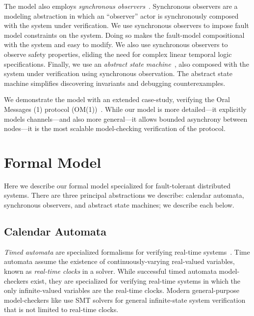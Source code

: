 \documentclass{IEEEtran/IEEEtran}
\newcommand{\lee}[1]{ } %
\newcommand{\lee}[1]{ {\color{blue}$<$lee: #1$>$} } %
\begin{document}
The model also employs \emph{synchronous observers}~\cite{}. Synchronous observers are a modeling abstraction in which an ``observer'' actor is synchronously composed with the system under verification. We use synchronous observers to impose fault model constraints on the system. Doing so makes the fault-model compositional with the system and easy to modify. We also use synchronous observers to observe safety properties, eliding the need for complex linear temporal logic specifications. Finally, we use an \emph{abstract state machine}~\cite{}, also composed with the system under verification using synchronous observation. The abstract state machine simplifies discovering invariants and debugging counterexamples.

We demonstrate the model with an extended case-study, verifying the Oral Messages (1) protocol (OM(1))~\cite{}. While our model is more detailed---it explicitly models channels---and also more general---it allows bounded asynchrony between nodes---it is the most scalable model-checking verification of the protocol.

\lee{finish intro...  One more contribution is that we abstract faults using partially interpreted functions in model-checking, which is new? Note focus is on infinite-state model-checking}



\section{Formal Model}\label{sec:model}
Here we describe our formal model specialized for fault-tolerant distributed systems. There are three principal abstractions we describe: calendar automata, synchronous observers, and abstract state machines; we describe each below.

\subsection{Calendar Automata}\label{sec:calendar}
\emph{Timed automata} are specialized formalisms for verifying real-time systems~\cite{}. Time automata assume the existence of continuously-varying real-valued variables, known as \emph{real-time clocks} in a solver. While successful timed automata model-checkers exist, they are specialized for verifying real-time systems in which the only infinite-valued variables are the real-time clocks. Modern general-purpose model-checkers like \lee{name some} use SMT solvers for general infinite-state system verification that is not limited to real-time clocks.
\end{document}
